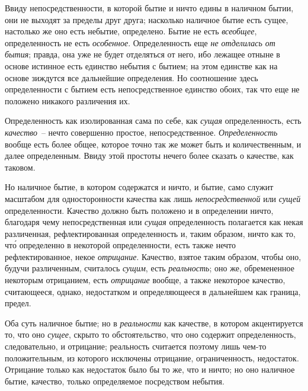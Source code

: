 Ввиду непосредственности, в которой бытие и ничто
едины в наличном бытии, они не выходят за пределы
друг друга; насколько наличное бытие есть сущее, настолько
же оно есть небытие, определено. Бытие не есть
\emph{всеобщее}, определенность не есть \emph{особенное}. Определенность
еще \emph{не отделилась от бытия}; правда, она уже не
будет отделяться от него, ибо лежащее отныне в основе
истинное есть единство небытия с бытием; на этом единстве
как на основе зиждутся все дальнейшие определения.
Но соотношение здесь определенности с бытием
есть непосредственное единство обоих, так что еще не
положено никакого различения их.

Определенность как изолированная сама по себе, как
\emph{сущая} определенность, есть \emph{качество}~-- нечто совершенно
простое, непосредственное. \emph{Определенность} вообще есть
более общее, которое точно так же может быть и количественным,
и далее определенным. Ввиду этой простоты
нечего более сказать о качестве, как таковом.

Но наличное бытие, в котором содержатся и ничто, и
бытие, само служит масштабом для односторонности качества
как лишь \emph{непосредственной} или \emph{сущей} определенности.
Качество должно быть положено и в определении
ничто, благодаря чему непосредственная или \emph{сущая} определенность
полагается как некая различенная, рефлектированная
определенность и, таким образом, ничто как то,
чт\'о определенно в некоторой определенности, есть также
нечто рефлектированное, некое \emph{отрицание}. Качество, взятое
таким образом, чтобы оно, будучи различенным, считалось
\emph{сущим}, есть \emph{реальность}; оно же, обремененное некоторым
отрицанием, есть \emph{отрицание} вообще, а также
некоторое качество, считающееся, однако, недостатком и
определяющееся в дальнейшем как граница, предел.

Оба суть наличное бытие; но в \emph{реальности} как качестве,
в котором акцентируется то, что оно \emph{сущее}, скрыто
то обстоятельство, что оно содержит определенность, следовательно,
и отрицание; реальность считается поэтому
лишь чем-то положительным, из которого исключены
отрицание, ограниченность, недостаток. Отрицание только
как недостаток было бы то же, что и ничто; но оно
наличное бытие, качество, только определяемое посредством
небытия.


